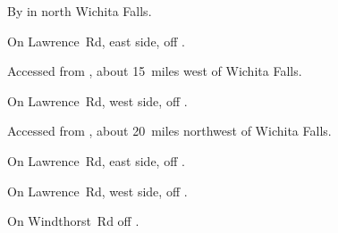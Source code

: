 
\begin{LocationList}

By   in north Wichita Falls.

On Lawrence~Rd, east side, off  .

Accessed from  , about 15~miles west of Wichita Falls.

On Lawrence~Rd, west side, off  .

Accessed from , about 20~miles northwest of Wichita Falls.

On Lawrence~Rd, east side, off  .

On Lawrence~Rd, west side, off  .

\Location{\TruckStop \Gas \Rest \Service \Weigh}
On Windthorst~Rd off  .

\end{LocationList}
